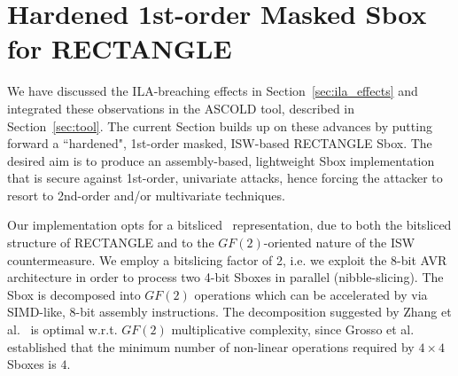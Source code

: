 \section{Hardened 1st-order Masked Sbox for RECTANGLE}\label{sec:rectangle}


We have discussed the ILA-breaching effects in Section~\ref{sec:ila_effects} 
and integrated these observations in the ASCOLD tool, described in Section~\ref{sec:tool}. 
The current Section builds up on these advances by putting forward a ``hardened", 
1st-order masked, ISW-based RECTANGLE Sbox. The desired aim is to produce an assembly-based, 
lightweight Sbox implementation that is secure against 1st-order, univariate attacks, 
hence forcing the attacker to resort to 2nd-order and/or multivariate techniques. 

Our implementation opts for a bitsliced~\cite{DBLP:conf/fse/DaemenGV93,DBLP:conf/fse/Biham97a} representation, 
due to both the bitsliced structure of RECTANGLE and to the $GF(2)$-oriented 
nature of the ISW countermeasure. We employ a bitslicing factor of 2, 
i.e. we exploit the 8-bit AVR architecture in order to process two 4-bit Sboxes 
in parallel (nibble-slicing). The Sbox is decomposed into $GF(2)$ operations which 
can be accelerated by via SIMD-like, 8-bit assembly instructions. 
The decomposition suggested by Zhang et al.~\cite{DBLP:journals/chinaf/ZhangBLR0V15} 
is optimal w.r.t. $GF(2)$ multiplicative complexity, 
since Grosso et al.~\cite{DBLP:conf/fse/GrossoLSV14} established that the minimum 
number of non-linear operations required by $4 \times 4$ Sboxes is $4$. 

